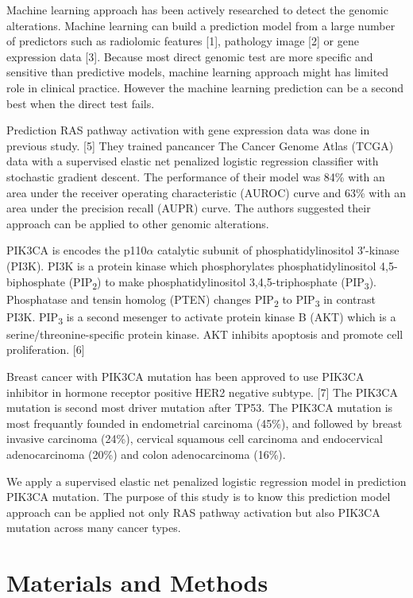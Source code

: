 \documentclass[10pt,letterpaper]{article}
\begin{document}
Machine learning approach has been actively researched to detect the
genomic alterations. Machine learning can build a prediction model from
a large number of predictors such as radiolomic features {[}1{]},
pathology image {[}2{]} or gene expression data {[}3{]}. Because most
direct genomic test are more specific and sensitive than predictive
models, machine learning approach might has limited role in clinical
practice. However the machine learning prediction can be a second best
when the direct test fails.

Prediction RAS pathway activation with gene expression data was done in
previous study. {[}5{]} They trained pancancer The Cancer Genome Atlas
(TCGA) data with a supervised elastic net penalized logistic regression
classifier with stochastic gradient descent. The performance of their
model was 84\% with an area under the receiver operating characteristic
(AUROC) curve and 63\% with an area under the precision recall (AUPR)
curve. The authors suggested their approach can be applied to other
genomic alterations.

PIK3CA is encodes the p110\(\alpha\) catalytic subunit of
phosphatidylinositol 3′-kinase (PI3K). PI3K is a protein kinase which
phosphorylates phosphatidylinositol 4,5-biphosphate
(PIP\textsubscript{2}) to make phosphatidylinositol 3,4,5-triphosphate
(PIP\textsubscript{3}). Phosphatase and tensin homolog (PTEN) changes
PIP\textsubscript{2} to PIP\textsubscript{3} in contrast PI3K.
PIP\textsubscript{3} is a second mesenger to activate protein kinase B
(AKT) which is a serine/threonine-specific protein kinase. AKT inhibits
apoptosis and promote cell proliferation. {[}6{]}

Breast cancer with PIK3CA mutation has been approved to use PIK3CA
inhibitor in hormone receptor positive HER2 negative subtype. {[}7{]}
The PIK3CA mutation is second most driver mutation after TP53. The
PIK3CA mutation is most frequantly founded in endometrial carcinoma
(45\%), and followed by breast invasive carcinoma (24\%), cervical
squamous cell carcinoma and endocervical adenocarcinoma (20\%) and colon
adenocarcinoma (16\%).

We apply a supervised elastic net penalized logistic regression model in
prediction PIK3CA mutation. The purpose of this study is to know this
prediction model approach can be applied not only RAS pathway activation
but also PIK3CA mutation across many cancer types.

\hypertarget{materials-and-methods}{%
\section{Materials and Methods}\label{materials-and-methods}}
\end{document}
